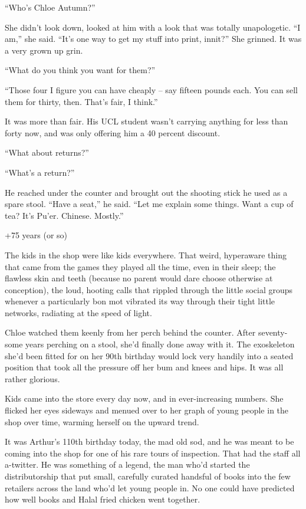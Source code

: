“Who's Chloe Autumn?”

She didn't look down, looked at him with a look that was totally 
unapologetic. “I am,” she said. “It's one way to get my stuff 
into print, innit?” She grinned. It was a very grown up grin.

“What do you think you want for them?”

“Those four I figure you can have cheaply -- say fifteen pounds each. 
You can sell them for thirty, then. That's fair, I think.”

It was more than fair. His UCL student wasn't carrying anything for 
less than forty now, and was only offering him a 40 percent discount.

“What about returns?”

“What's a return?”

He reached under the counter and brought out the shooting stick he used 
as a spare stool. “Have a seat,” he said. “Let me explain some 
things. Want a cup of tea? It's Pu'er. Chinese. Mostly.”

\tb

+75 years (or so)

The kids in the shop were like kids everywhere. That weird, hyperaware 
thing that came from the games they played all the time, even in their 
sleep; the flawless skin and teeth (because no parent would dare choose 
otherwise at conception), the loud, hooting calls that rippled through 
the little social groups whenever a particularly bon mot vibrated its 
way through their tight little networks, radiating at the speed of 
light.

Chloe watched them keenly from her perch behind the counter. After 
seventy-some years perching on a stool, she'd finally done away with 
it. The exoskeleton she'd been fitted for on her 90th birthday would 
lock very handily into a seated position that took all the pressure off 
her bum and knees and hips. It was all rather glorious.

Kids came into the store every day now, and in ever-increasing numbers. 
She flicked her eyes sideways and menued over to her graph of young 
people in the shop over time, warming herself on the upward trend.

It was Arthur's 110th birthday today, the mad old sod, and he was meant 
to be coming into the shop for one of his rare tours of inspection. 
That had the staff all a-twitter. He was something of a legend, the man 
who'd started the distributorship that put small, carefully curated 
handsful of books into the few retailers across the land who'd let 
young people in. No one could have predicted how well books and Halal 
fried chicken went together.

